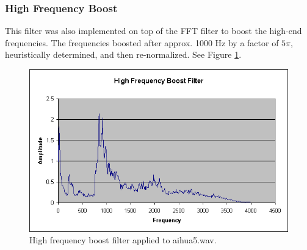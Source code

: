 \subsubsection{High Frequency Boost}

This filter was also implemented on top of the FFT filter to boost the high-end
frequencies. The frequencies boosted after approx. 1000 Hz by a factor
of $5\pi$, heuristically determined, and then re-normalized. See Figure \ref{fig:high-boost}.

\begin{figure}
	\centering
	\includegraphics[width=400pt]{../graphics/graphs/high-frequency-boost.png}
	\caption{High frequency boost filter applied to aihua5.wav.}
	\label{fig:high-boost}
\end{figure}

